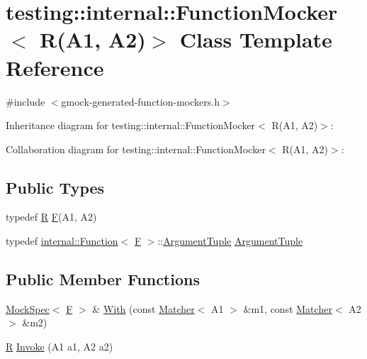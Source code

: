 \hypertarget{classtesting_1_1internal_1_1_function_mocker_3_01_r_07_a1_00_01_a2_08_4}{}\section{testing\+:\+:internal\+:\+:Function\+Mocker$<$ R(A1, A2)$>$ Class Template Reference}
\label{classtesting_1_1internal_1_1_function_mocker_3_01_r_07_a1_00_01_a2_08_4}


{\ttfamily \#include $<$gmock-\/generated-\/function-\/mockers.\+h$>$}



Inheritance diagram for testing\+:\+:internal\+:\+:Function\+Mocker$<$ R(A1, A2)$>$\+:


Collaboration diagram for testing\+:\+:internal\+:\+:Function\+Mocker$<$ R(A1, A2)$>$\+:
\subsection*{Public Types}
\begin{DoxyCompactItemize}
\item 
typedef \hyperlink{typedefs__9_8js_afb423b73ee7b6c04d2d54fc06e405404}{R} \hyperlink{classtesting_1_1internal_1_1_function_mocker_3_01_r_07_a1_00_01_a2_08_4_a61302610bfc9b30588ea345e468310b2}{F}(A1, A2)
\item 
typedef \hyperlink{structtesting_1_1internal_1_1_function}{internal\+::\+Function}$<$ \hyperlink{classtesting_1_1internal_1_1_function_mocker_3_01_r_07_a1_00_01_a2_08_4_a61302610bfc9b30588ea345e468310b2}{F} $>$\+::\hyperlink{classtesting_1_1internal_1_1_function_mocker_3_01_r_07_a1_00_01_a2_08_4_ae75e3ba40a99224f7363681914212c19}{Argument\+Tuple} \hyperlink{classtesting_1_1internal_1_1_function_mocker_3_01_r_07_a1_00_01_a2_08_4_ae75e3ba40a99224f7363681914212c19}{Argument\+Tuple}
\end{DoxyCompactItemize}
\subsection*{Public Member Functions}
\begin{DoxyCompactItemize}
\item 
\hyperlink{classtesting_1_1internal_1_1_mock_spec}{Mock\+Spec}$<$ \hyperlink{classtesting_1_1internal_1_1_function_mocker_3_01_r_07_a1_00_01_a2_08_4_a61302610bfc9b30588ea345e468310b2}{F} $>$ \& \hyperlink{classtesting_1_1internal_1_1_function_mocker_3_01_r_07_a1_00_01_a2_08_4_a7e17361fadc89120c1254826baa3200e}{With} (const \hyperlink{classtesting_1_1_matcher}{Matcher}$<$ A1 $>$ \&m1, const \hyperlink{classtesting_1_1_matcher}{Matcher}$<$ A2 $>$ \&m2)
\item 
\hyperlink{typedefs__9_8js_afb423b73ee7b6c04d2d54fc06e405404}{R} \hyperlink{classtesting_1_1internal_1_1_function_mocker_3_01_r_07_a1_00_01_a2_08_4_a518f5ac78887c64580343554aaae8f44}{Invoke} (A1 a1, A2 a2)
\end{DoxyCompactItemize}
